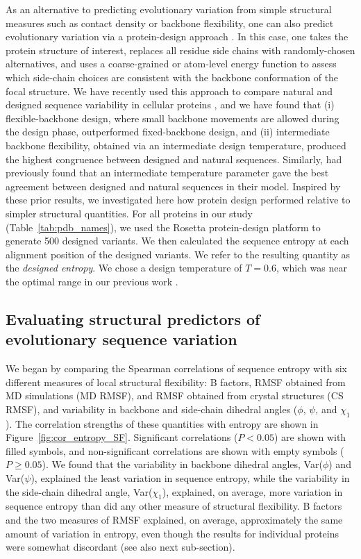 \documentclass[smallextended]{svjour3}
\begin{document}
As an alternative to predicting evolutionary variation from simple structural measures such as contact density or backbone flexibility, one can also predict evolutionary variation via a protein-design approach \citep{DokholyanShakhnovich2001,OllikainenKortemme2013,Jacksonetal2013}. In this case, one takes the protein structure of interest, replaces all residue side chains with randomly-chosen alternatives, and uses a coarse-grained or atom-level energy function to assess which side-chain choices are consistent with the backbone conformation of the focal structure. We have recently used this approach to compare natural and designed sequence variability in cellular proteins  \citep{Jacksonetal2013}, and we have found that (i) flexible-backbone design, where small backbone movements are allowed during the design phase, outperformed fixed-backbone design, and (ii) intermediate backbone flexibility, obtained via an intermediate design temperature, produced the highest congruence between designed and natural sequences. Similarly, \citet{DokholyanShakhnovich2001} had previously found that an intermediate temperature parameter gave the best agreement between designed and natural sequences in their model. Inspired by these prior results, we investigated here how protein design performed relative to simpler structural quantities. For all proteins in our study (Table~\ref{tab:pdb_names}), we used the Rosetta protein-design platform \citep{LeaverFayetal2011} to generate 500 designed variants. We then calculated the sequence entropy at each alignment position of the designed variants. We refer to the resulting quantity as the \emph{designed entropy}. We chose a design temperature of $T=0.6$, which was near the optimal range in our previous work \citep{Jacksonetal2013}.

\subsection*{Evaluating structural predictors of evolutionary sequence variation}

We began by comparing the Spearman correlations of sequence entropy with six different measures of local structural flexibility: B factors, RMSF obtained from MD simulations (MD RMSF), and RMSF obtained from crystal structures (CS RMSF), and variability in backbone and side-chain dihedral angles ($\phi$, $\psi$, and $\chi_1$). The correlation strengths of these quantities with entropy are shown in Figure~\ref{fig:cor_entropy_SF}. Significant correlations ($P<0.05$) are shown with filled symbols, and non-significant correlations are shown with empty symbols ($P\geq0.05$). We found that the variability in backbone dihedral angles, Var($\phi$) and Var($\psi$), explained the least variation in sequence entropy, while the variability in the side-chain dihedral angle, Var($\chi_1$), explained, on average, more variation in sequence entropy than did any other measure of structural flexibility. B factors and the two measures of RMSF explained, on average, approximately the same amount of variation in entropy, even though the results for individual proteins were somewhat discordant (see also next sub-section). 
\end{document}
